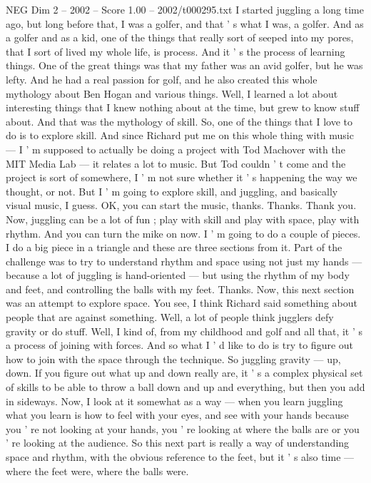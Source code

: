 \begin{textsample}{NEG Dim 2 – 2002 – Score 1.00 – 2002/t000295.txt}  \label{ex:f2_neg_043}
I started juggling a long time ago, but long before that, I was a golfer, and that ' s what I was, a golfer.
And as a golfer and as a kid, one of the things that really sort of seeped into my pores, that I sort of lived my whole life, is process.
And it ' s the process of learning things.
One of the great things was that my father was an avid golfer, but he was lefty.
And he had a real passion for golf, and he also created this whole mythology about Ben Hogan and various things.
Well, I learned a lot about interesting things that I knew nothing about at the time, but grew to know stuff about.
And that was the mythology of skill.
So, one of the things that I love to do is to explore skill.
And since Richard put me on this whole thing with music — I ' m supposed to actually be doing a project with Tod Machover with the MIT Media Lab — it relates a lot to music.
But Tod couldn ' t come and the project is sort of somewhere, I ' m not sure whether it ' s happening the way we thought, or not.
But I ' m going to explore skill, and juggling, and basically visual music, I guess.
OK, you can start the music, thanks.
Thanks.
Thank you.
Now, juggling can be a lot of fun ; play with skill and play with space, play with rhythm.
And you can turn the mike on now.
I ' m going to do a couple of pieces.
I do a big piece in a triangle and these are three sections from it.
Part of the challenge was to try to understand rhythm and space using not just my hands — because a lot of juggling is hand-oriented — but using the rhythm of my body and feet, and controlling the balls with my feet.
Thanks.
Now, this next section was an attempt to explore space.
You see, I think Richard said something about people that are against something.
Well, a lot of people think jugglers defy gravity or do stuff.
Well, I kind of, from my childhood and golf and all that, it ' s a process of joining with forces.
And so what I ' d like to do is try to figure out how to join with the space through the technique.
So juggling gravity — up, down.
If you figure out what up and down really are, it ' s a complex physical set of skills to be able to throw a ball down and up and everything, but then you add in sideways.
Now, I look at it somewhat as a way — when you learn juggling what you learn is how to feel with your eyes, and see with your hands because you ' re not looking at your hands, you ' re looking at where the balls are or you ' re looking at the audience.
So this next part is really a way of understanding space and rhythm, with the obvious reference to the feet, but it ' s also time — where the feet were, where the balls were.

\end{textsample}
